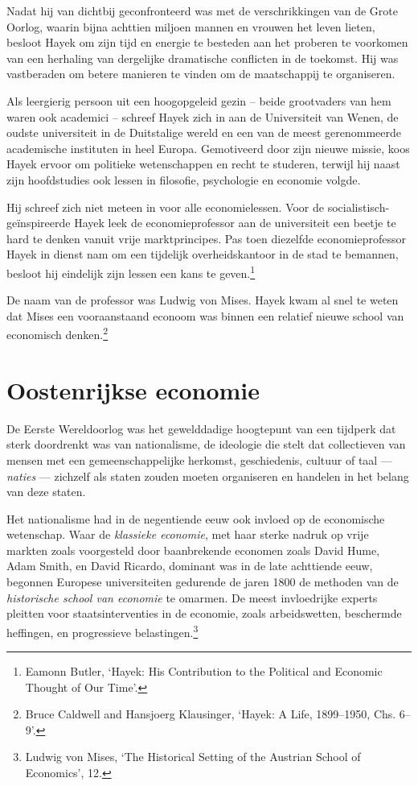 \documentclass[smalldemyvopaper,11pt,twoside,onecolumn,openright,extrafontsizes,hidelinks]{memoir}
\begin{document}
Nadat hij van dichtbij geconfronteerd was met de verschrikkingen van de
Grote Oorlog, waarin bijna achttien miljoen mannen en vrouwen het leven
lieten, besloot Hayek om zijn tijd en energie te besteden aan het
proberen te voorkomen van een herhaling van dergelijke dramatische
conflicten in de toekomst. Hij was vastberaden om betere manieren te
vinden om de maatschappij te organiseren.

Als leergierig persoon uit een hoogopgeleid gezin -- beide grootvaders
van hem waren ook academici -- schreef Hayek zich in aan de Universiteit
van Wenen, de oudste universiteit in de Duitstalige wereld en een van de
meest gerenommeerde academische instituten in heel Europa. Gemotiveerd
door zijn nieuwe missie, koos Hayek ervoor om politieke wetenschappen en
recht te studeren, terwijl hij naast zijn hoofdstudies ook lessen in
filosofie, psychologie en economie volgde.

Hij schreef zich niet meteen in voor alle economielessen. Voor de
socialistisch-geïnspireerde Hayek leek de economieprofessor aan de
universiteit een beetje te hard te denken vanuit vrije marktprincipes.
Pas toen diezelfde economieprofessor Hayek in dienst nam om een
tijdelijk overheidskantoor in de stad te bemannen, besloot hij eindelijk
zijn lessen een kans te geven.\footnote{\hspace{0pt}Eamonn Butler,
  `Hayek: His Contribution to the Political and Economic Thought of Our
  Time'.}

De naam van de professor was Ludwig von Mises. Hayek kwam al snel te
weten dat Mises een vooraanstaand econoom was binnen een relatief nieuwe
school van economisch denken.\footnote{\hspace{0pt}Bruce Caldwell and
  Hansjoerg Klausinger, `Hayek: A Life, 1899--1950, Chs. 6--9'.}

\section{Oostenrijkse economie}\label{oostenrijkse-economie}

De Eerste Wereldoorlog was het gewelddadige hoogtepunt van een tijdperk
dat sterk doordrenkt was van nationalisme, de ideologie die stelt dat
collectieven van mensen met een gemeenschappelijke herkomst,
geschiedenis, cultuur of taal --- \emph{naties} --- zichzelf als staten
zouden moeten organiseren en handelen in het belang van deze staten.

Het nationalisme had in de negentiende eeuw ook invloed op de
economische wetenschap. Waar de \emph{klassieke economie}, met haar
sterke nadruk op vrije markten zoals voorgesteld door baanbrekende
economen zoals David Hume, Adam Smith, en David Ricardo, dominant was in
de late achttiende eeuw, begonnen Europese universiteiten gedurende de
jaren 1800 de methoden van de \emph{historische school van economie} te
omarmen. De meest invloedrijke experts pleitten voor staatsinterventies
in de economie, zoals arbeidswetten, beschermde heffingen, en
progressieve belastingen.\footnote{\hspace{0pt}Ludwig von Mises, `The
  Historical Setting of the Austrian School of Economics', 12.}
\end{document}
